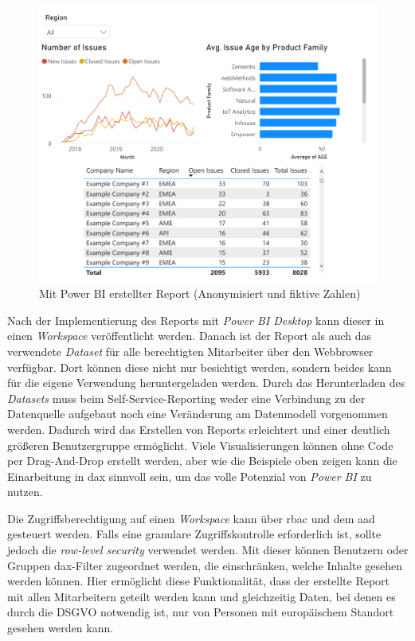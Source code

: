 \begin{figure}[htbp]
 \centering
 \includegraphics[width=\textwidth]{gfx/pbi_report.pdf}
 \caption[Power BI Report]{Mit Power BI erstellter Report (Anonymisiert und fiktive Zahlen)}
\label{fig:praktischeUmsetzung:pbiRep}
\end{figure}

Nach der Implementierung des Reports mit \textit{Power BI Desktop} kann dieser in einen \textit{Workspace} veröffentlicht werden. Danach ist der Report als auch das verwendete \textit{Dataset} für alle berechtigten Mitarbeiter über den Webbrowser verfügbar. Dort können diese nicht nur besichtigt werden, sondern beides kann für die eigene Verwendung heruntergeladen werden. Durch das Herunterladen des \textit{Datasets} muss beim Self-Service-Reporting weder eine Verbindung zu der Datenquelle aufgebaut noch eine Veränderung am Datenmodell vorgenommen werden. Dadurch wird das Erstellen von Reports erleichtert und einer deutlich größeren Benutzergruppe ermöglicht. Viele Visualisierungen können ohne Code per Drag-And-Drop erstellt werden, aber wie die Beispiele oben zeigen kann die Einarbeitung in \ac{dax} sinnvoll sein, um das volle Potenzial von \textit{Power BI} zu nutzen.

Die Zugriffsberechtigung auf einen \textit{Workspace} kann über \ac{rbac} und dem \ac{aad} gesteuert werden. Falls eine granulare Zugriffskontrolle erforderlich ist, sollte jedoch die \textit{row-level security} verwendet werden. Mit dieser können Benutzern oder Gruppen \ac{dax}-Filter zugeordnet werden, die einschränken, welche Inhalte gesehen werden können. Hier ermöglicht diese Funktionalität, dass der erstellte Report mit allen Mitarbeitern geteilt werden kann und gleichzeitig Daten, bei denen es durch die DSGVO notwendig ist, nur von Personen mit europäischem Standort gesehen werden kann.

